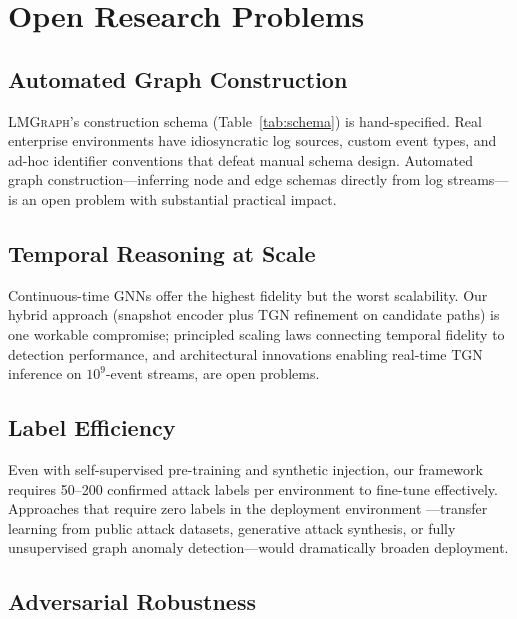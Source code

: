 \documentclass[sigconf,nonacm]{acmart}
\begin{document}
\section{Open Research Problems}
\label{sec:open}

\subsection{Automated Graph Construction}

\textsc{LMGraph}'s construction schema (Table~\ref{tab:schema}) is
hand-specified. Real enterprise environments have idiosyncratic log sources,
custom event types, and ad-hoc identifier conventions that defeat manual
schema design. Automated graph construction---inferring node and edge
schemas directly from log streams---is an open problem with substantial
practical impact.

\subsection{Temporal Reasoning at Scale}

Continuous-time GNNs offer the highest fidelity but the worst scalability.
Our hybrid approach (snapshot encoder plus TGN refinement on candidate paths)
is one workable compromise; principled scaling laws connecting temporal
fidelity to detection performance, and architectural innovations enabling
real-time TGN inference on $10^9$-event streams, are open problems.

\subsection{Label Efficiency}

Even with self-supervised pre-training and synthetic injection, our framework
requires 50--200 confirmed attack labels per environment to fine-tune
effectively. Approaches that require zero labels in the deployment environment
---transfer learning from public attack datasets, generative attack
synthesis, or fully unsupervised graph anomaly detection---would dramatically
broaden deployment.

\subsection{Adversarial Robustness}
\end{document}
